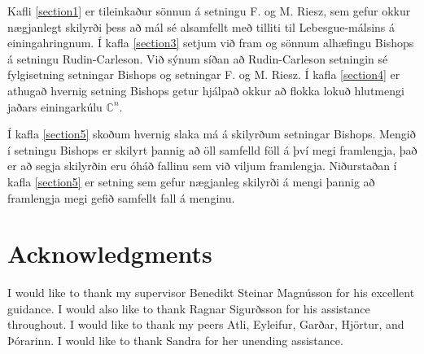 \documentclass[a4paper,12pt,twoside,BCOR=10mm]{scrbook}
\theoremstyle{definition}
\theoremstyle{definition}
\theoremstyle{definition}
\begin{document}
Kafli \ref{section1} er tileinkaður sönnun á setningu F. og M. Riesz, sem gefur okkur nægjanlegt skilyrði þess að mál sé alsamfellt með tilliti til Lebesgue-málsins á einingahringnum.
Í kafla \ref{section3} setjum við fram og sönnum alhæfingu Bishops á setningu Rudin-Carleson.
Við sýnum síðan að Rudin-Carleson setningin sé fylgisetning setningar Bishops og setningar F. og M. Riesz.
Í kafla \ref{section4} er athugað hvernig setning Bishops getur hjálpað okkur að flokka lokuð hlutmengi jaðars einingarkúlu $\mathbb{C}^n$.

Í kafla \ref{section5} skoðum hvernig slaka má á skilyrðum setningar Bishops.
Mengið í setningu Bishops er skilyrt þannig að öll samfelld föll á því megi framlengja, það er að segja skilyrðin eru óháð fallinu sem við viljum framlengja.
Niðurstaðan í kafla \ref{section5} er setning sem gefur nægjanleg skilyrði á mengi þannig að framlengja megi gefið samfellt fall á menginu.
\vfill
\newpage

\tableofcontents



\chapter*{Acknowledgments}
I would like to thank my supervisor Benedikt Steinar Magnússon for his excellent guidance.
I would also like to thank Ragnar Sigurðsson for his assistance throughout.
I would like to thank my peers Atli, Eyleifur, Garðar, Hjörtur, and Þórarinn.
I would like to thank Sandra for her unending assistance.

\setcounter{page}{1}
\end{document}
